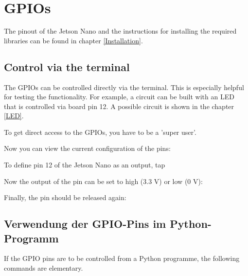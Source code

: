

\section{GPIOs} \label{GPIO}

The pinout of the Jetson Nano and the instructions for installing the required libraries can be found in chapter \ref{Installation}.

\subsection{Control via the terminal}
The GPIOs can be controlled directly via the terminal. This is especially helpful for testing the functionality. For example, a circuit can be built with an LED that is controlled via board pin 12. A possible circuit is shown in the chapter \ref{LED}. 

\medskip

To get direct access to the GPIOs, you have to be a 'super user'.

\medskip
{}
\medskip

Now you can view the current configuration of the pins:

\medskip
{}
\medskip

To define pin 12 of the Jetson Nano as an output, tap

\medskip
{} \newline
{}
\medskip

Now the output of the pin can be set to high (3.3 V) or low (0 V):

\medskip
{} \newline
{}
\medskip

Finally, the pin should be released again:

\medskip
{}
\medskip

\subsection{Verwendung der GPIO-Pins im Python-Programm}

If the GPIO pins are to be controlled from a Python programme, the following commands are elementary.

